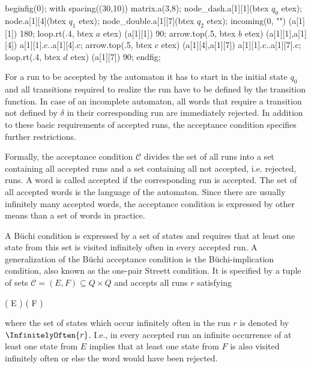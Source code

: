 \stopsubsection


    beginfig(0);
        with spacing((30,10)) matrix.a(3,8);
        node_dash.a[1][1](btex $q_0$ etex);
        node.a[1][4](btex $q_1$ etex);
        node_double.a[1][7](btex $q_2$ etex);
        incoming(0, "") (a[1][1]) 180;
        loop.rt(.4, btex \;$a$ etex) (a[1][1]) 90;
        arrow.top(.5, btex $b$ etex) (a[1][1],a[1][4]) a[1][1].c..a[1][4].c;
        arrow.top(.5, btex $c$ etex) (a[1][4],a[1][7]) a[1][1].c..a[1][7].c;
        loop.rt(.4, btex \;$d$ etex) (a[1][7]) 90;
    endfig;
\stopreusableMPgraphic

\startsubsection[title={Acceptance Conditions}]

    For a run to be accepted by the automaton it has to start in the initial state $q_0$ and all transitions required to realize the run have to be defined by the transition function.
    In case of an incomplete automaton, all words that require a transition not defined by $\delta$ in their corresponding run are immediately rejected.
    In addition to these basic requirements of accepted runs, the acceptance condition specifies further restrictions.

    Formally, the acceptance condition ${\mathcal C}$ divides the set of all runs into a set containing all accepted runs and a set containing all not accepted, i.e. rejected, runs.
    A word is called accepted if the corresponding run is accepted.
    The set of all accepted words is the language of the automaton.
    Since there are usually infinitely many accepted words, the acceptance condition is expressed by other means than a set of words in practice.

    A Büchi condition is expressed by a set of states and requires that at least one state from this set is visited infinitely often in every accepted run.
    A generalization of the Büchi acceptance condition is the Büchi-implication condition, also known as the one-pair Streett condition. %
    It is specified by a tuple of sets $\mathcal{C} = (E, F) \subseteq Q \times Q$ and accepts all runs $r$ satisfying

    \startformula
        ( \cap E \ne \emptyset) \Longrightarrow ( \cap F \ne \emptyset) \EndComma
    \stopformula

    where the set of states which occur infinitely often in the run $r$ is denoted by $\InfinitelyOften{r}$.
    I.e., in every accepted run an infinite occurrence of at least one state from $E$ implies that at least one state from $F$ is also visited infinitely often or else the word would have been rejected. %

